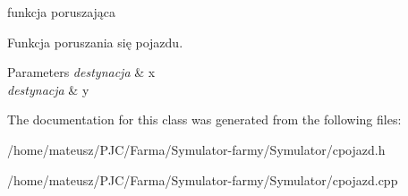 funkcja poruszająca 

Funkcja poruszania się pojazdu.


\begin{DoxyParams}{Parameters}
{\em destynacja} & x \\
\hline
{\em destynacja} & y \\
\hline
\end{DoxyParams}


The documentation for this class was generated from the following files\+:\begin{DoxyCompactItemize}
\item 
/home/mateusz/\+P\+J\+C/\+Farma/\+Symulator-\/farmy/\+Symulator/cpojazd.\+h\item 
/home/mateusz/\+P\+J\+C/\+Farma/\+Symulator-\/farmy/\+Symulator/cpojazd.\+cpp\end{DoxyCompactItemize}
